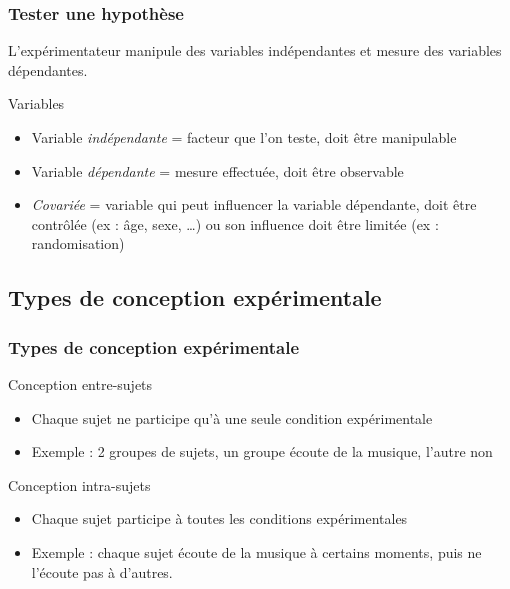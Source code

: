 \documentclass[xcolor=dvipsnames,english]{beamer}
\begin{document}
\begin{frame}
  \frametitle{Tester une hypothèse}
  L'expérimentateur manipule des variables indépendantes et mesure des variables dépendantes.
  \begin{block}{Variables}
    \begin{itemize}
      \item Variable \textit{indépendante} = facteur que l'on teste, doit être manipulable
      \item<2-> Variable \textit{dépendante} = mesure effectuée, doit être observable
      \item<3-> \textit{Covariée} = variable qui peut influencer la variable dépendante, doit être contrôlée (ex : âge, sexe, \dots) ou son influence doit être limitée (ex : randomisation)
    \end{itemize}
  \end{block}

\end{frame}

\subsection{Types de conception expérimentale}

\begin{frame}
  \frametitle{Types de conception expérimentale}

  \begin{block}{Conception entre-sujets}
    \begin{itemize}
      \item<1-> Chaque sujet ne participe qu'à une seule condition expérimentale
      \item<2-> Exemple : 2 groupes de sujets, un groupe écoute de la musique, l'autre non
    \end{itemize}
  \end{block}

  \begin{block}{Conception intra-sujets}
    \begin{itemize}
      \item<3-> Chaque sujet participe à toutes les conditions expérimentales
      \item<4-> Exemple : chaque sujet écoute de la musique à certains moments, puis ne l'écoute pas à d'autres.
    \end{itemize}
  \end{block}
\end{frame}
\end{document}
